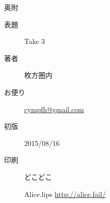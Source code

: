 
\vspace*{110mm}

\begin{flushright}
\begin{minipage}{70mm}
\begin{itembox}{ 奥附 }
  \begin{description}
    \item[表題] Take 3
    \item[著者] 枚方圏内
    \item[お便り] \url{cympfh@gmail.com}
    \item[初版] 2015/08/16
    \item[印刷] どこどこ
    \item[] \hspace*{-10pt} Alice.lips \url{http://alice.fail/}
  \end{description}
\end{itembox}
\end{minipage}
\end{flushright}

